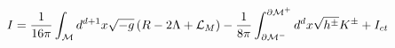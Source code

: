 \begin{equation}
I=\frac{1}{16\pi }\int_{{\cal M}}d^{d+1}x\sqrt{-g}\left( R-2\Lambda +{\cal L}%
_{M}\right) -\frac{1}{8\pi }\int_{{\cal \partial M}^{-}}^{{\cal \partial M}%
^{+}}d^{d}x\sqrt{h^{\pm }}K^{\pm }+I_{ct}  \label{totaction}
\end{equation}%
